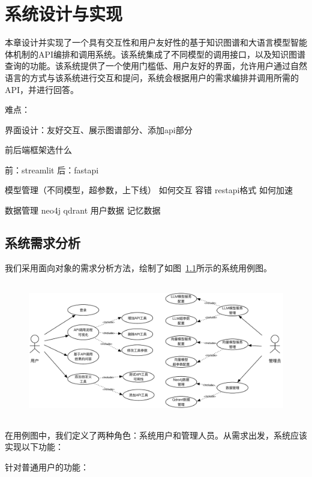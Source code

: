 
\chapter{系统设计与实现}

本章设计并实现了一个具有交互性和用户友好性的基于知识图谱和大语言模型智能体机制的API编排和调用系统。该系统集成了不同模型的调用接口，以及知识图谱查询的功能。该系统提供了一个使用门槛低、用户友好的界面，允许用户通过自然语言的方式与该系统进行交互和提问，系统会根据用户的需求编排并调用所需的API，并进行回答。

难点：

界面设计：友好交互、展示图谱部分、添加api部分

前后端框架选什么

前：streamlit 后：fastapi


模型管理（不同模型，超参数，上下线） 如何交互 容错 restapi格式 如何加速

数据管理 neo4j qdrant 用户数据 记忆数据

\section{系统需求分析}

\indent 我们采用面向对象的需求分析方法，绘制了如图~\ref{fig:usecase}所示的系统用例图。

\begin{figure}[!htp]
  \vspace{1em}
  \centering
  \setlength{\abovecaptionskip}{10pt} %
  \includegraphics[height=6cm]{../assets/ch5-用例图.pdf}
  \label{fig:usecase}
\end{figure}

在用例图中，我们定义了两种角色：系统用户和管理人员。从需求出发，系统应该实现以下功能：

针对普通用户的功能：

